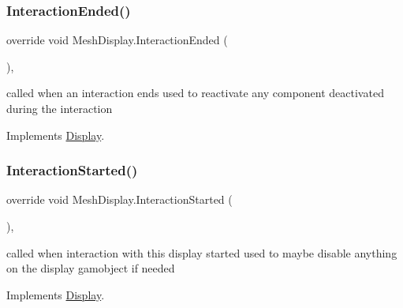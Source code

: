 \mbox{\label{class_mesh_display_a23f7ab8b0f48536940ad1cc2145297b3}} 
\subsubsection{\texorpdfstring{Interaction\+Ended()}{InteractionEnded()}}
{\footnotesize\ttfamily override void Mesh\+Display.\+Interaction\+Ended (\begin{DoxyParamCaption}{ }\end{DoxyParamCaption})\hspace{0.3cm}{\ttfamily [protected]}, {\ttfamily [virtual]}}



called when an interaction ends used to reactivate any component deactivated during the interaction 



Implements \mbox{\hyperlink{class_display_a6fd38485267e1b78f1d1dfb589ec4ae0}{Display}}.

\mbox{\label{class_mesh_display_aa4affc65c23027c877f511fc2b8aaeb8}} 
\subsubsection{\texorpdfstring{Interaction\+Started()}{InteractionStarted()}}
{\footnotesize\ttfamily override void Mesh\+Display.\+Interaction\+Started (\begin{DoxyParamCaption}{ }\end{DoxyParamCaption})\hspace{0.3cm}{\ttfamily [protected]}, {\ttfamily [virtual]}}



called when interaction with this display started used to maybe disable anything on the display gamobject if needed 



Implements \mbox{\hyperlink{class_display_a21c51fcf185403197a78a5acfd2065de}{Display}}.

\mbox{\label{class_mesh_display_a94176ce6e76cc683336051b49573ab1f}} 

